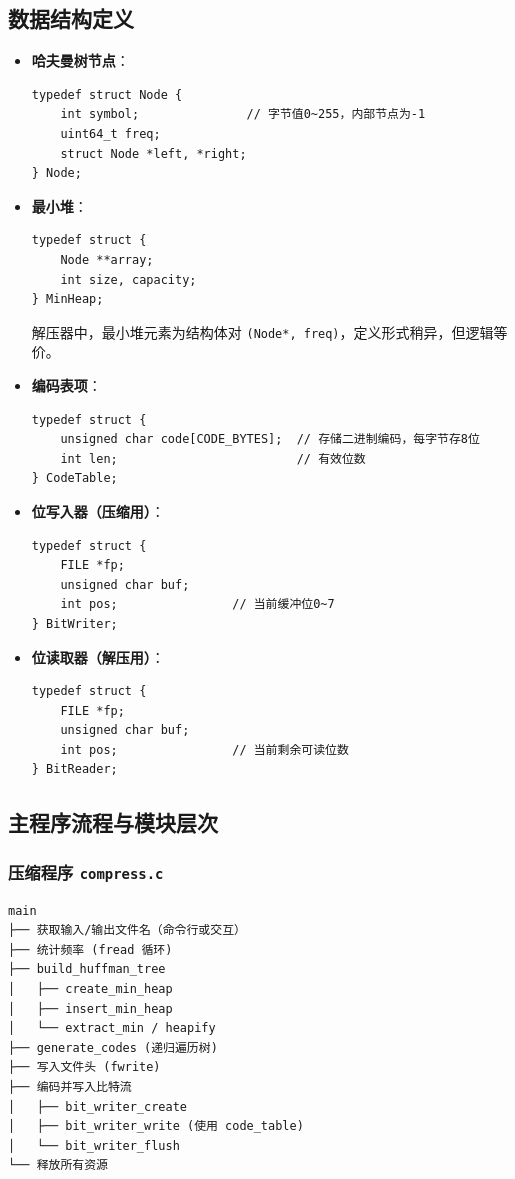 \documentclass[UTF8]{ctexart}
\begin{document}
\subsection{数据结构定义}
\begin{itemize}
    \item \textbf{哈夫曼树节点}：
\begin{lstlisting}
typedef struct Node {
    int symbol;               // 字节值0~255，内部节点为-1
    uint64_t freq;
    struct Node *left, *right;
} Node;
\end{lstlisting}
    \item \textbf{最小堆}：
\begin{lstlisting}
typedef struct {
    Node **array;
    int size, capacity;
} MinHeap;
\end{lstlisting}
    解压器中，最小堆元素为结构体对 \texttt{(Node*, freq)}，定义形式稍异，但逻辑等价。
    \item \textbf{编码表项}：
\begin{lstlisting}
typedef struct {
    unsigned char code[CODE_BYTES];  // 存储二进制编码，每字节存8位
    int len;                         // 有效位数
} CodeTable;
\end{lstlisting}
    \item \textbf{位写入器（压缩用）}：
\begin{lstlisting}
typedef struct {
    FILE *fp;
    unsigned char buf;
    int pos;                // 当前缓冲位0~7
} BitWriter;
\end{lstlisting}
    \item \textbf{位读取器（解压用）}：
\begin{lstlisting}
typedef struct {
    FILE *fp;
    unsigned char buf;
    int pos;                // 当前剩余可读位数
} BitReader;
\end{lstlisting}
\end{itemize}

\subsection{主程序流程与模块层次}
\subsubsection{压缩程序 \texttt{compress.c}}
\begin{verbatim}
main
├── 获取输入/输出文件名（命令行或交互）
├── 统计频率 (fread 循环)
├── build_huffman_tree
│   ├── create_min_heap
│   ├── insert_min_heap
│   └── extract_min / heapify
├── generate_codes (递归遍历树)
├── 写入文件头 (fwrite)
├── 编码并写入比特流
│   ├── bit_writer_create
│   ├── bit_writer_write (使用 code_table)
│   └── bit_writer_flush
└── 释放所有资源
\end{verbatim}
\end{document}
